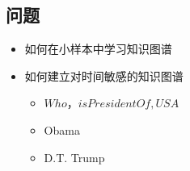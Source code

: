 \subsection*{问题}
\begin{frame}
\begin{itemize}
	\item 如何在小样本中学习知识图谱
	\item 如何建立对时间敏感的知识图谱
		\begin{itemize}
			\item \(Who，isPresidentOf,USA\)
			\item Obama
			\item D.T. Trump
		\end{itemize}
\end{itemize}
\end{frame}